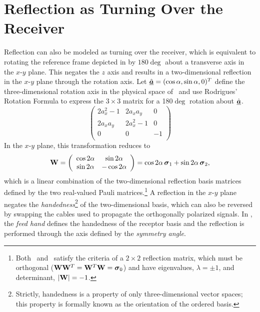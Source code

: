 \section{Reflection as Turning Over the Receiver}
\label{app:yaw_rotation}

Reflection can also be modeled as turning over the receiver, which is equivalent to rotating the reference frame depicted in 
by $180\deg$ about a transverse axis in the $x$-$y$ plane.
This negates the $z$ axis and results in a two-dimensional reflection in the $x$-$y$ plane 
through the rotation axis.
%
Let $\hat{\underline{\mbox{\boldmath $a$}}}=(\cos\alpha,\sin\alpha,0)^T$ define the three-dimensional 
rotation axis in the physical space of \  
and use Rodrigues' Rotation Formula to express the $3\times3$ matrix 
for a 180$\deg$ rotation about $\hat{\underline{\mbox{\boldmath $a$}}}$.
\begin{equation}
\left( \begin{array}{ccc}
2a_x^2 - 1 & 2a_x a_y    & 0 \\
2a_x a_y   & 2a_x^2 - 1  & 0 \\
0          & 0           & -1 \\
  \end{array} \right)
  \end{equation}
In the $x$-$y$ plane, this transformation reduces to 
\begin{equation}
{\bf W} = \left( \begin{array}{cc}
\cos2\alpha  & \sin2\alpha  \\
\sin2\alpha  & -\cos2\alpha 
  \end{array} \right)
  = \cos2\alpha\, \mbox{\boldmath $\sigma$}_{1} + \sin2\alpha\, \mbox{\boldmath $\sigma$}_{2},
\end{equation}
%
which is a linear combination of the two-dimensional reflection basis matrices 
defined by the two real-valued Pauli matrices.\footnote{
%
Both \ and \ 
satisfy the criteria of a $2\times2$ reflection matrix, which must be orthogonal 
(${\bf W}{\bf W}^T = {\bf W}^T{\bf W} = \mbox{\boldmath $\sigma$}_{0}$) and
have eigenvalues, $\lambda = \pm 1$, and determinant, $|{\bf W}|=-1$.
%
}
A reflection in the $x$-$y$ plane negates the \emph{handedness}\footnote{
%
Strictly, handedness is a property of only three-dimensional
vector spaces; this property is formally known as the orientation of the ordered basis. }
of the two-dimensional basis, which can also be reversed by swapping the cables 
used to propagate the orthogonally polarized signals.
%
In \citet{vmjr10}, the \emph{feed hand} defines the handedness of the receptor basis
and the reflection is performed through the axis defined by the \emph{symmetry angle}.

